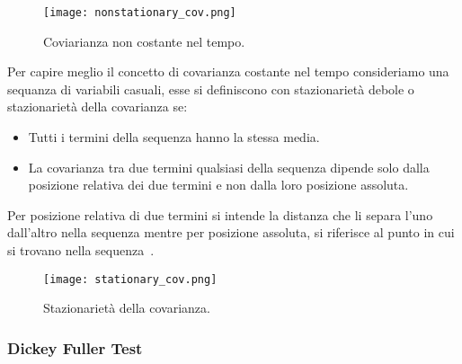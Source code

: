 \begin{enumerate}
    \begin{figure}[H]
        \centering
        \texttt{[image: nonstationary\_cov.png]}
        \caption{Coviarianza non costante nel tempo.}
        \label{fig:nons_cov}
    \end{figure}

    Per capire meglio il concetto di covarianza costante nel tempo 
    consideriamo una sequanza di variabili casuali, esse si definiscono
    con stazionarietà debole o stazionarietà della covarianza se:

    \begin{itemize}
        \setlength\itemsep{-0.6em}
        \item Tutti i termini della sequenza hanno la stessa media.
        \item La covarianza tra due termini qualsiasi della sequenza 
        dipende solo dalla posizione relativa dei due termini e non dalla 
        loro posizione assoluta.
    \end{itemize}

    Per posizione relativa di due termini si intende la distanza che 
    li separa l'uno dall'altro nella sequenza mentre per posizione assoluta, 
    si riferisce al punto in cui si trovano nella sequenza~\cite{sl:cov_stat}.

    \begin{figure}[H]
        \centering
        \texttt{[image: stationary\_cov.png]}
        \caption{Stazionarietà della covarianza.}
    \end{figure}

\end{enumerate}


\subsubsection{Dickey Fuller Test}